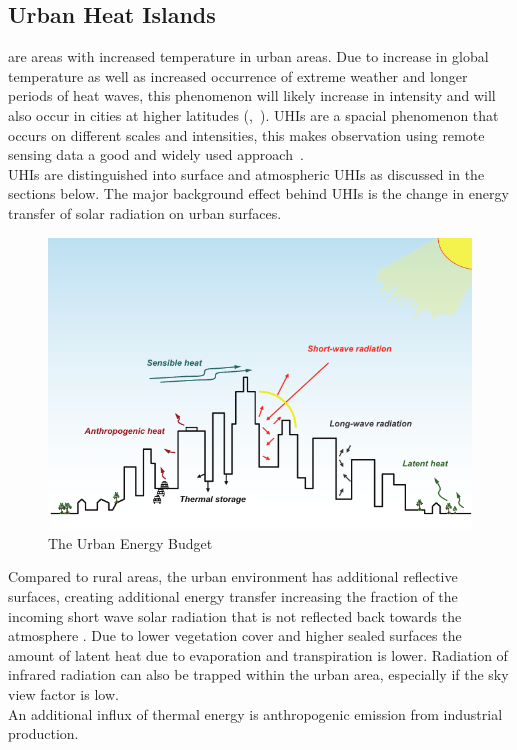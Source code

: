 \documentclass[12pt,a4paper, english,twoside]{scrartcl}
\begin{document}
  \subsection{Urban Heat Islands}\label{sec:uhi}
     are areas with increased temperature in urban areas.
    Due to increase in global temperature as well as increased occurrence of extreme weather and longer periods of heat waves, this phenomenon will likely increase in intensity and will also occur in cities at higher latitudes (\cite{Sachindra2016},~\cite[p.~904]{Wilby2008}).
    \glspl{UHI} are a spacial phenomenon that occurs on different scales and intensities, this makes observation using remote sensing data a good and widely used approach~\autocite{Weng2003}.\\
    \glspl{UHI} are distinguished into surface and atmospheric \glspl{UHI} as discussed in the sections below. 
    The major background effect behind \glspl{UHI} is the change in energy transfer of solar radiation on urban surfaces. 
    \begin{figure}[htbp]
      \begin{center}
        \includegraphics[width=\textwidth]{img/radiationBudget.png}
      \end{center}
      \caption{The Urban Energy Budget~\autocite[Fig. 7, Reprinted from]{EPA2008}\label{fig:radiationbudget}}
    \end{figure}
    Compared to rural areas, the urban environment has additional reflective surfaces, creating additional energy transfer increasing the fraction of the incoming short wave solar radiation that is not reflected back towards the atmosphere \autocite[p.12]{EPA2008}. 
    Due to lower vegetation cover and higher sealed surfaces the amount of latent heat due to evaporation and transpiration is lower.
    Radiation of infrared radiation can also be trapped within the urban area, especially if the sky view factor is low.\\ 
    An additional influx of thermal energy is anthropogenic emission from industrial production.
\end{document}
